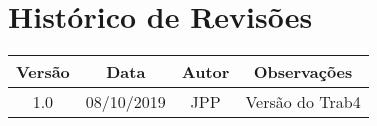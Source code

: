 \chapter*{\centering Histórico de Revisões}

\begin{center}
    \begin{tabular}{|c|c|c|c|}
        \hline
        Versão & Data       & Autor & Observações                                      \\
        \hline
        1.0    & 08/10/2019 & JPP   & Versão do Trab4                                  \\
        \hline
    \end{tabular}
\end{center}
